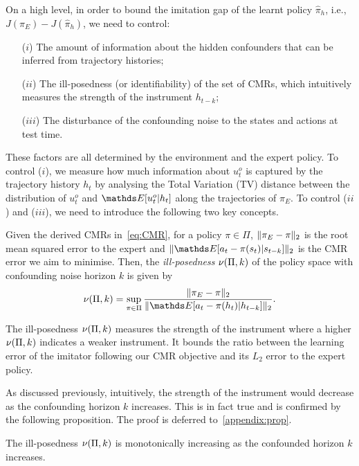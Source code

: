 On a high level, in order to bound the imitation gap of the learnt policy $\hat{\pi}_h$, i.e., $J(\pi_E)-J(\hat{\pi}_h)$, we need to control:
\begin{enumerate}
    \item[($i$)] The amount of information about the hidden confounders that can be inferred from trajectory histories;
    \item[($ii$)] The ill-posedness (or identifiability) of the set of CMRs, which intuitively measures the strength of the instrument $h_{t-k}$;
    \item[($iii$)] The disturbance of the confounding noise to the states and actions at test time.
\end{enumerate}
These factors are all determined by the environment and the expert policy. To control ($i$), we measure how much information about $u^o_t$ is captured by the trajectory history $h_t$ by analysing the Total Variation (TV) distance between the distribution of $u^o_t$ and $\expectE[u^o_t\lvert h_t]$ along the trajectories of $\pi_E$. To control ($ii$) and ($iii$), we need to introduce the following two key concepts.

\begin{definition}

Given the derived CMRs in~\cref{eq:CMR}, for a policy $\pi\in\Pi$, $\lVert\pi_E-\pi\rVert_2$ is the root mean squared error to the expert and $\norm{\expectE[a_t-\pi(s_t)\lvert s_{t-k}]}_2$ is the CMR error we aim to minimise. Then, the \emph{ill-posedness} $\nu(\Pi,k)$ of the policy space with confounding noise horizon $k$ is given by
\begin{align*}
    \ill(\Pi,k)=\sup_{\pi\in\Pi} \frac{\norm{\pi_E-\pi}_{2}}{\norm{\expectE[a_t-\pi(h_t)\lvert h_{t-k}]}_{2}}.
\end{align*}
\end{definition}
The ill-posedness $\nu(\Pi,k)$ measures the strength of the instrument where a higher $\nu(\Pi,k)$ indicates a weaker instrument. It bounds the ratio between the learning error of the imitator following our CMR objective and its $L_2$ error to the expert policy. 

As discussed previously, intuitively, the strength of the instrument would decrease as the confounding horizon $k$ increases. This is in fact true and is confirmed by the following proposition. The proof is deferred to~\cref{appendix:prop}. 
\begin{proposition}\label{prop:ill-posed}
The ill-posedness $\nu(\Pi,k)$ is monotonically increasing as the confounded horizon $k$ increases.
\end{proposition}

